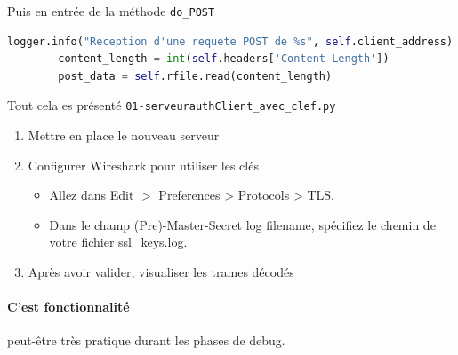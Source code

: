 \documentclass[french, 12pt]{article}%
\newcommand{\itemE}{\item[$\bullet$]}
\begin{document}
Puis en entrée de la méthode \verb?do_POST?
\begin{lstlisting}[style=commande, language=Python]
logger.info("Reception d'une requete POST de %s", self.client_address)
        content_length = int(self.headers['Content-Length'])
        post_data = self.rfile.read(content_length)
\end{lstlisting}

Tout cela es présenté \verb?01-serveurauthClient_avec_clef.py?

\begin{enumerate}
\item Mettre en place le nouveau serveur
\item Configurer Wireshark pour utiliser les clés
	\begin{itemize}
	\itemE Allez dans Edit $>$ Preferences > Protocols > TLS.
	\itemE Dans le champ (Pre)-Master-Secret log filename, spécifiez le chemin de votre fichier ssl\_keys.log.
	\end{itemize}
\item Après avoir valider, visualiser les trames décodés
\end{enumerate}

\paragraph{C'est fonctionnalité} peut-être très pratique durant les phases de debug.
\end{document}
